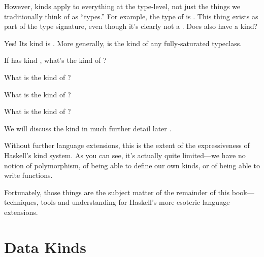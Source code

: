 \documentclass[book.tex]{subfiles}
\begin{document}
However, kinds apply to everything at the type-level, not just the things we
traditionally think of as ``types.'' For example, the type of  is
. This  thing exists as part of the type
signature, even though it's clearly not a . Does  also
have a kind?

Yes! Its kind is . More generally,  is the
kind of any fully-saturated typeclass.

\begin{exercise}
If  has kind , what's the kind of
?
\end{exercise}
\begin{solution}
\end{solution}

\begin{exercise}
What is the kind of ?
\end{exercise}
\begin{solution}
\end{solution}

\begin{exercise}
What is the kind of ?
\end{exercise}
\begin{solution}
\end{solution}

\begin{exercise}
What is the kind of ?
\end{exercise}
\begin{solution}
\end{solution}

We will discuss the  kind in much further detail later
.

Without further language extensions, this is the extent of the expressiveness of
Haskell's kind system. As you can see, it's actually quite limited---we have
no notion of polymorphism, of being able to define our own kinds, or of being
able to write functions.

Fortunately, those things are the subject matter of the remainder of this
book---techniques, tools and understanding for Haskell's more esoteric language
extensions.


\section{Data Kinds}
\end{document}
